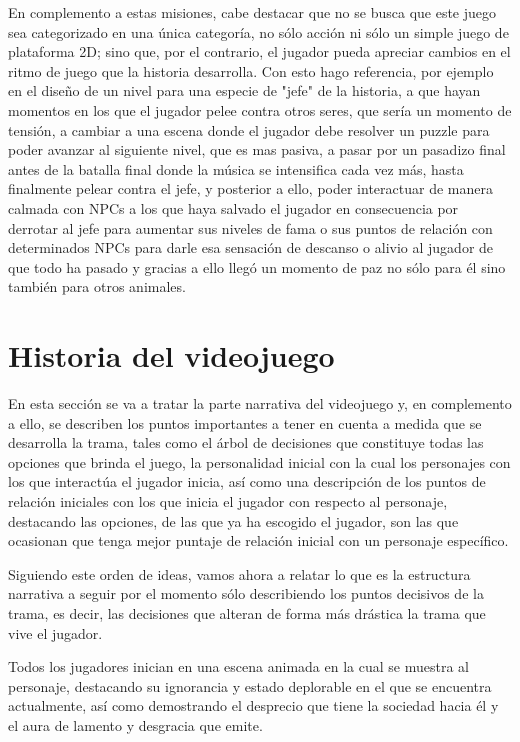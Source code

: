 \documentclass{article}
\begin{document}
En complemento a estas misiones, cabe destacar que no se busca que este juego sea categorizado en una única categoría, no sólo acción ni sólo un simple juego de plataforma 2D; sino que, por el contrario, el jugador pueda apreciar cambios en el ritmo de juego que la historia desarrolla. Con esto hago referencia, por ejemplo en el diseño de un nivel para una especie de "jefe" de la historia, a que hayan momentos en los que el jugador pelee contra otros seres, que sería un momento de tensión, a cambiar a una escena donde el jugador debe resolver un puzzle para poder avanzar al siguiente nivel, que es mas pasiva, a pasar por un pasadizo final antes de la batalla final donde la música se intensifica cada vez más, hasta finalmente pelear contra el jefe, y posterior a ello, poder interactuar de manera calmada con NPCs a los que haya salvado el jugador en consecuencia por derrotar al jefe para aumentar sus niveles de fama o sus puntos de relación con determinados NPCs para darle esa sensación de descanso o alivio al jugador de que todo ha pasado y gracias a ello llegó un momento de paz no sólo para él sino también para otros animales.
\section{Historia del videojuego} \label{narrative_part}
En esta sección se va a tratar la parte narrativa del videojuego y, en complemento a ello, se describen los puntos importantes a tener en cuenta a medida que se desarrolla la trama, tales como el árbol de decisiones que constituye todas las opciones que brinda el juego, la personalidad inicial con la cual los personajes con los que interactúa el jugador inicia, así como una descripción de los puntos de relación iniciales con los que inicia el jugador con respecto al personaje, destacando las opciones, de las que ya ha escogido el jugador, son las que ocasionan que tenga mejor puntaje de relación inicial con un personaje específico.

Siguiendo este orden de ideas, vamos ahora a relatar lo que es la estructura narrativa a seguir por el momento sólo describiendo los puntos decisivos de la trama, es decir, las decisiones que alteran de forma más drástica la trama que vive el jugador.

Todos los jugadores inician en una escena animada en la cual se muestra al personaje, destacando su ignorancia y estado deplorable en el que se encuentra actualmente, así como demostrando el desprecio que tiene la sociedad hacia él y el aura de lamento y desgracia que emite.
\end{document}
